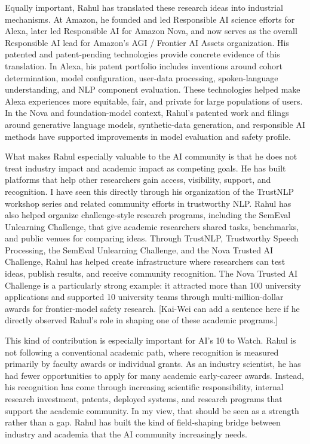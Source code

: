 \documentclass[11pt]{article}
\begin{document}
Equally important, Rahul has translated these research ideas into industrial mechanisms. At Amazon, he founded and led Responsible AI science efforts for Alexa, later led Responsible AI for Amazon Nova, and now serves as the overall Responsible AI lead for Amazon's AGI / Frontier AI Assets organization. His patented and patent-pending technologies provide concrete evidence of this translation. In Alexa, his patent portfolio includes inventions around cohort determination, model configuration, user-data processing, spoken-language understanding, and NLP component evaluation. These technologies helped make Alexa experiences more equitable, fair, and private for large populations of users. In the Nova and foundation-model context, Rahul's patented work and filings around generative language models, synthetic-data generation, and responsible AI methods have supported improvements in model evaluation and safety profile.

What makes Rahul especially valuable to the AI community is that he does not treat industry impact and academic impact as competing goals. He has built platforms that help other researchers gain access, visibility, support, and recognition. I have seen this directly through his organization of the TrustNLP workshop series and related community efforts in trustworthy NLP. Rahul has also helped organize challenge-style research programs, including the SemEval Unlearning Challenge, that give academic researchers shared tasks, benchmarks, and public venues for comparing ideas. Through TrustNLP, Trustworthy Speech Processing, the SemEval Unlearning Challenge, and the Nova Trusted AI Challenge, Rahul has helped create infrastructure where researchers can test ideas, publish results, and receive community recognition. The Nova Trusted AI Challenge is a particularly strong example: it attracted more than 100 university applications and supported 10 university teams through multi-million-dollar awards for frontier-model safety research. [Kai-Wei can add a sentence here if he directly observed Rahul's role in shaping one of these academic programs.]

This kind of contribution is especially important for AI's 10 to Watch. Rahul is not following a conventional academic path, where recognition is measured primarily by faculty awards or individual grants. As an industry scientist, he has had fewer opportunities to apply for many academic early-career awards. Instead, his recognition has come through increasing scientific responsibility, internal research investment, patents, deployed systems, and research programs that support the academic community. In my view, that should be seen as a strength rather than a gap. Rahul has built the kind of field-shaping bridge between industry and academia that the AI community increasingly needs.
\end{document}
